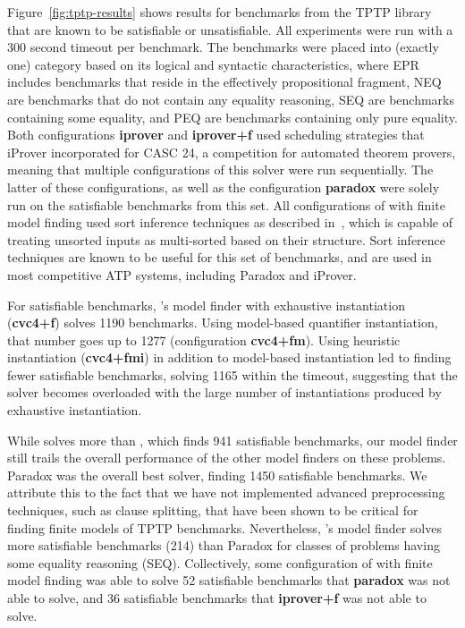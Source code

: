 \documentclass{svjour3}                     %
\begin{document}
Figure~\ref{fig:tptp-results} shows results
for benchmarks from the TPTP library that are known to be satisfiable or unsatisfiable.
All experiments were run with a 300 second timeout per benchmark.
The benchmarks were placed into (exactly one) category based on its logical and syntactic characteristics,
where EPR includes benchmarks that reside in the effectively propositional fragment,
NEQ are benchmarks that do not contain any equality reasoning,
SEQ are benchmarks containing some equality,
and PEQ are benchmarks containing only pure equality.
Both configurations {\bf iprover} and {\bf iprover+f}
used scheduling strategies that iProver incorporated for CASC 24, a competition for automated theorem provers,
meaning that multiple configurations of this solver were run sequentially.
The latter of these configurations, as well as the configuration {\bf paradox} were solely run on the satisfiable benchmarks from this set.
All configurations of \cvc with finite model finding used sort inference techniques as described in~\cite{reynolds2013finite},
which is capable of treating unsorted inputs as multi-sorted based on their structure.
Sort inference techniques are known to be useful for this set of benchmarks, 
and are used in most competitive ATP systems, including Paradox and iProver.

For satisfiable benchmarks,
\cvc's model finder with exhaustive instantiation ({\bf cvc4+f})
solves 1190 benchmarks.
Using model-based quantifier instantiation,
that number goes up to 1277 (configuration {\bf cvc4+fm}).
Using heuristic instantiation ({\bf cvc4+fmi}) in addition to model-based instantiation
led to finding fewer satisfiable benchmarks, solving 1165 within the timeout,
suggesting that the solver becomes overloaded with the large number of instantiations
produced by exhaustive instantiation.

While \cvc solves more than \ziii, which finds 941 satisfiable benchmarks, 
our model finder still trails the overall performance 
of the other model finders on these problems.
Paradox was the overall best solver, finding 1450 satisfiable benchmarks.
We attribute this to the fact that we have not implemented advanced preprocessing techniques,
such as clause splitting, that have been shown to be critical for finding finite models of TPTP benchmarks.
Nevertheless, \cvc's model finder solves more satisfiable benchmarks (214) than Paradox for classes of problems
having some equality reasoning (SEQ).
Collectively, some configuration of \cvc with finite model finding 
was able to solve 52 satisfiable benchmarks that {\bf paradox} was not able to solve,
and 36 satisfiable benchmarks that {\bf iprover+f} was not able to solve.
\end{document}
